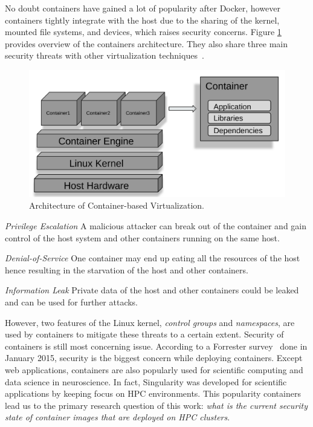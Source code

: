 \documentclass[a4paper,num-refs]{oup-contemporary}
\begin{document}
No doubt containers have gained a lot of popularity after Docker, however containers tightly
integrate with the host due to the sharing of the kernel, 
mounted file systems, and devices, which raises security
concerns. Figure \ref{fig:container-overview} provides overview of the containers architecture.
They also share three main security threats with other virtualization
techniques~\cite{gantikow2016providing}.

\begin{figure}
  \centering
  \includegraphics[width=.7\columnwidth]{Figures/container.png}
  \caption{Architecture of Container-based
                Virtualization.}
  \label{fig:container-overview}
\end{figure}

\textit{Privilege Escalation} A malicious attacker can break out of the container
and gain control of the host system and other containers running on the same host.

\textit{Denial-of-Service} One container may end up eating all the resources of the
host hence resulting in the starvation of the host and other containers.

\textit{Information Leak} Private data of the host and other containers could be
leaked and can be used for further attacks.


However, two features of the Linux kernel, \textit{control groups} and \textit{namespaces},
are used by containers to mitigate these threats to a certain extent. Security
of containers is still most concerning issue. According to a Forrester survey~\cite{} done in January
2015, security is the
biggest concern while deploying containers.
Except web applications, containers are also popularly used for scientific computing
and data science in neuroscience. In fact, Singularity was developed for scientific applications
by keeping focus on HPC environments. This popularity containers lead us to the
primary research question of this work: \textit{what is the current security state of
container images that are deployed on HPC clusters}.
\end{document}
